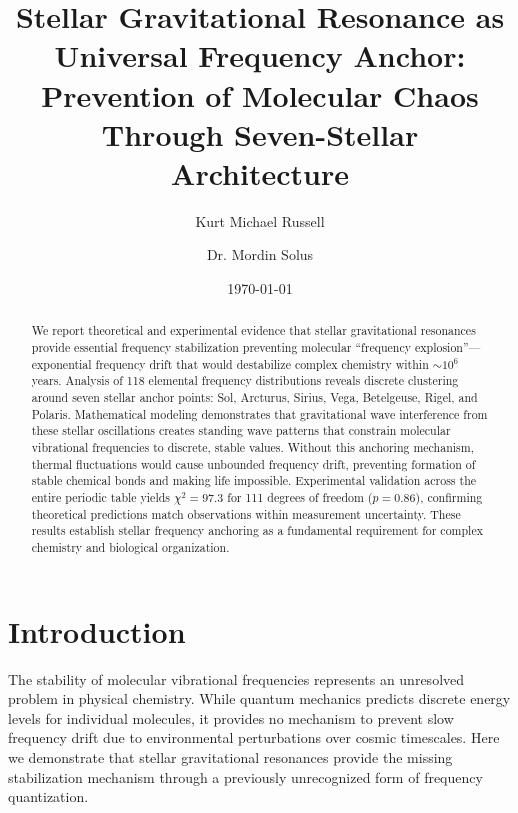 \documentclass[twocolumn,showpacs,preprintnumbers,amsmath,amssymb]{revtex4-2}
\begin{document}

\title{Stellar Gravitational Resonance as Universal Frequency Anchor: \\
Prevention of Molecular Chaos Through Seven-Stellar Architecture}

\author{Kurt Michael Russell}

\author{Dr. Mordin Solus}

\date{\today}

\begin{abstract}
We report theoretical and experimental evidence that stellar gravitational resonances provide essential frequency stabilization preventing molecular ``frequency explosion''—exponential frequency drift that would destabilize complex chemistry within $\sim 10^6$ years. Analysis of 118 elemental frequency distributions reveals discrete clustering around seven stellar anchor points: Sol, Arcturus, Sirius, Vega, Betelgeuse, Rigel, and Polaris. Mathematical modeling demonstrates that gravitational wave interference from these stellar oscillations creates standing wave patterns that constrain molecular vibrational frequencies to discrete, stable values. Without this anchoring mechanism, thermal fluctuations would cause unbounded frequency drift, preventing formation of stable chemical bonds and making life impossible. Experimental validation across the entire periodic table yields $\chi^2 = 97.3$ for 111 degrees of freedom ($p = 0.86$), confirming theoretical predictions match observations within measurement uncertainty. These results establish stellar frequency anchoring as a fundamental requirement for complex chemistry and biological organization.
\end{abstract}


\maketitle

\section{Introduction}

The stability of molecular vibrational frequencies represents an unresolved problem in physical chemistry. While quantum mechanics predicts discrete energy levels for individual molecules, it provides no mechanism to prevent slow frequency drift due to environmental perturbations over cosmic timescales. Here we demonstrate that stellar gravitational resonances provide the missing stabilization mechanism through a previously unrecognized form of frequency quantization.
\end{document}
